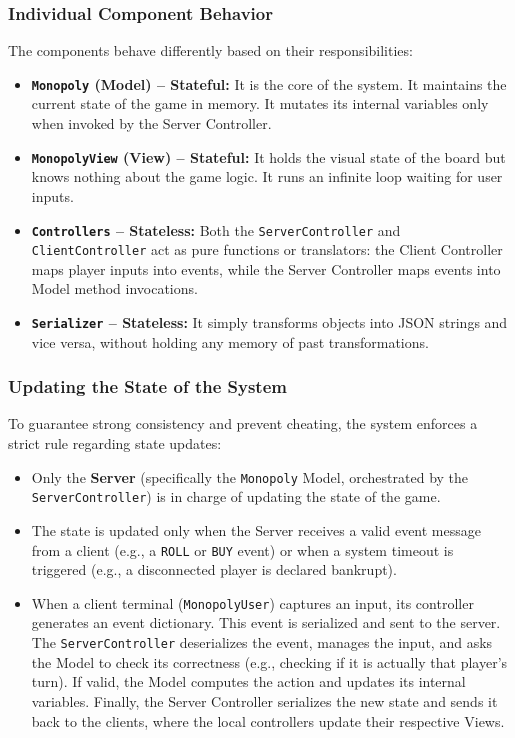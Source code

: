 \documentclass{scrartcl}
\begin{document}
\subsubsection*{Individual Component Behavior}
The components behave differently based on their responsibilities:
\begin{itemize}
    \item \textbf{\texttt{Monopoly} (Model) -- Stateful:} It is the core of the system.
    It maintains the current state of the game in memory.
    It mutates its internal variables only when invoked by the Server Controller.
    \item \textbf{\texttt{MonopolyView} (View) -- Stateful:} It holds the visual state of the board but knows nothing about the game logic.
    It runs an infinite loop waiting for user inputs.
    \item \textbf{\texttt{Controllers} -- Stateless:} Both the \texttt{ServerController} and \texttt{ClientController} act as pure functions or translators:
    the Client Controller maps player inputs into events, while the Server Controller maps events into Model method invocations.
    \item \textbf{\texttt{Serializer} -- Stateless:} It simply transforms objects into JSON strings and vice versa, without holding any memory of past transformations.
\end{itemize}

\subsubsection*{Updating the State of the System}
To guarantee strong consistency and prevent cheating, the system enforces a strict rule regarding state updates:
\begin{itemize}
    \item Only the \textbf{Server} (specifically the \texttt{Monopoly} Model,
    orchestrated by the \texttt{ServerController}) is in charge of updating the state of the game.
    \item The state is updated only when the Server receives a valid event message from a client (e.g., a \texttt{ROLL} or \texttt{BUY} event)
    or when a system timeout is triggered (e.g., a disconnected player is declared bankrupt).
    \item When a client terminal (\texttt{MonopolyUser}) captures an input, its controller generates an event dictionary.
    This event is serialized and sent to the server.
    The \texttt{ServerController} deserializes the event, manages the input, and asks the Model to check its correctness (e.g., checking if it is actually that player's turn).
    If valid, the Model computes the action and updates its internal variables.
    Finally, the Server Controller serializes the new state and sends it back to the clients,
    where the local controllers update their respective Views.
\end{itemize}
\end{document}
